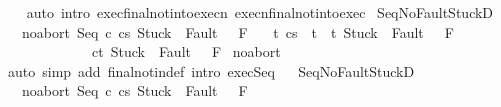 \begin{isabellebody}
%
\isadelimproof
\ \ %
\endisadelimproof
%
\isatagproof
{}\isamarkupfalse%
\ {\isacharparenleft}auto\ intro{\isacharcolon}\ exec{\isacharunderscore}final{\isacharunderscore}notin{\isacharunderscore}to{\isacharunderscore}execn\ execn{\isacharunderscore}final{\isacharunderscore}notin{\isacharunderscore}to{\isacharunderscore}exec{\isacharparenright}%
\endisatagproof
{\isafoldproof}%
%
\isadelimproof
\isanewline
%
\endisadelimproof
\isanewline
{}\isamarkupfalse%
\ Seq{\isacharunderscore}NoFaultStuckD{}{\isacharcolon}\ \isanewline
\ \ \ noabort{\isacharcolon}\ {\isachardoublequoteopen}{\isasymGamma}{\isasymturnstile}{\isasymlangle}Seq\ c{}\ c{}{\isacharcomma}s{\isasymrangle}\ {\isasymRightarrow}{\isasymnotin}{\isacharparenleft}{\isacharbraceleft}Stuck{\isacharbraceright}\ {\isasymunion}\ Fault\ {\isacharbackquote}\ \ F{\isacharparenright}{\isachardoublequoteclose}\isanewline
\ \ \ {\isachardoublequoteopen}{\isasymforall}t{\isachardot}\ {\isasymGamma}{\isasymturnstile}{\isasymlangle}c{}{\isacharcomma}s{\isasymrangle}\ {\isasymRightarrow}\ t\ {\isasymlongrightarrow}\ t{\isasymnotin}\ {\isacharparenleft}{\isacharbraceleft}Stuck{\isacharbraceright}\ {\isasymunion}\ Fault\ {\isacharbackquote}\ \ F{\isacharparenright}\ {\isasymlongrightarrow}\ \isanewline
\ \ \ \ \ \ \ \ \ \ \ \ \ {\isasymGamma}{\isasymturnstile}{\isasymlangle}c{}{\isacharcomma}t{\isasymrangle}\ {\isasymRightarrow}{\isasymnotin}{\isacharparenleft}{\isacharbraceleft}Stuck{\isacharbraceright}\ {\isasymunion}\ Fault\ {\isacharbackquote}\ \ F{\isacharparenright}{\isachardoublequoteclose}\isanewline
%
\isadelimproof
%
\endisadelimproof
%
\isatagproof
{}\isamarkupfalse%
\ noabort\isanewline
{}\isamarkupfalse%
\ {\isacharparenleft}auto\ simp\ add{\isacharcolon}\ final{\isacharunderscore}notin{\isacharunderscore}def\ intro{\isacharcolon}\ exec{\isacharunderscore}Seq{\isacharprime}{\isacharparenright}%
\endisatagproof
{\isafoldproof}%
%
\isadelimproof
%
\endisadelimproof
\ \isamarkupfalse%
\ Seq{\isacharunderscore}NoFaultStuckD{}{\isacharcolon}\ \isanewline
\ \ \ noabort{\isacharcolon}\ {\isachardoublequoteopen}{\isasymGamma}{\isasymturnstile}{\isasymlangle}Seq\ c{}\ c{}{\isacharcomma}s{\isasymrangle}\ {\isasymRightarrow}{\isasymnotin}{\isacharparenleft}{\isacharbraceleft}Stuck{\isacharbraceright}\ {\isasymunion}\ Fault\ {\isacharbackquote}\ \ F{\isacharparenright}{\isachardoublequoteclose}\isanewline

\end{isabellebody}
